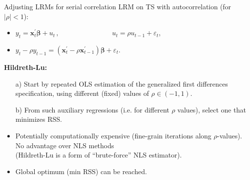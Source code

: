 \documentclass{beamer}
\begin{document}
\begin{frame}{Adjusting LRMs for serial correlation}
LRM on TS with autocorrelation (for $|\rho|<1$):\\ \medskip
\begin{itemize}
    \item $y_t=\bm{x}_t^{\prime} \bm{\beta} + u_t \,,\qquad \qquad \qquad~~~~~~~\, u_t = \rho u_{t-1}+\varepsilon_t$,
    \item $y_t - \rho y_{t-1} =  ( \bm{x}_t^{\prime} - \rho \bm{x}_{t-1}^{\prime}) \bm{\beta} + \varepsilon_t$.
\end{itemize}
\medskip
\textbf{Hildreth-Lu:} \\ \medskip
\begin{itemize}
    \item[a)] Start by repeated OLS estimation of the generalized first differences specification, using different (fixed) values of $\rho \in (-1,1)$. 
    \item[b)] From such auxiliary regressions (i.e. for different $\rho$ values), select one that minimizes RSS.
    \medskip
    \item Potentially computationally expensive (fine-grain iterations along $\rho$-values). No advantage over NLS methods \\(Hildreth-Lu is a form of ``brute-force'' NLS estimator).
    \item Global optimum (min RSS) can be reached.
\end{itemize}
\end{frame}
\end{document}
